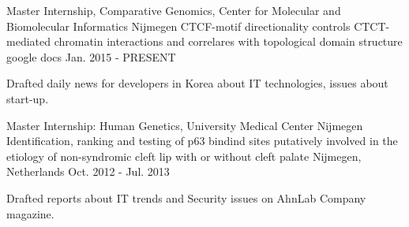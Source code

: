 

\begin{cventries}

  \cventry
    {Master Internship, Comparative Genomics,  Center for Molecular and Biomolecular Informatics Nijmegen} %
    {CTCF-motif directionality controls CTCT-mediated chromatin interactions and correlares with topological domain structure} %
    {google docs} %
    {Jan. 2015 - PRESENT} %
    {
      \begin{cvitems} %
        \item {Drafted daily news for developers in Korea about IT technologies, issues about start-up.}
      \end{cvitems}
    }

  \cventry
    {Master Internship: Human Genetics, University Medical Center Nijmegen} %
    {Identification, ranking and testing of p63 bindind sites putatively involved in the etiology of non-syndromic cleft lip with or without cleft palate} %
    {Nijmegen, Netherlands} %
    {Oct. 2012 - Jul. 2013} %
    {
      \begin{cvitems} %
        \item {Drafted reports about IT trends and Security issues on AhnLab Company magazine.}
      \end{cvitems}
    }

\end{cventries}
